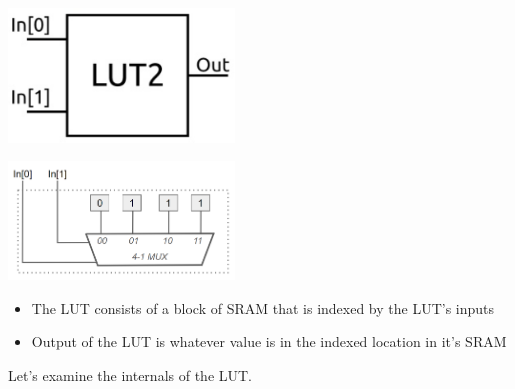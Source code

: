 \documentclass{article}
\begin{document}
\begin{minipage}[t]{0.5\textwidth}
    \centering
    \includegraphics[width=6cm, scale=1]{S2/2LUT.PNG}
\end{minipage}%
\begin{minipage}[t]{0.5\textwidth}
    \centering
    \includegraphics[width=6cm, scale=1]{S2/2LUT_muxView.PNG}
\end{minipage}%


\begin{itemize}
    \item The LUT consists of a block of SRAM that is indexed by the LUT's inputs
    \item Output of the LUT is whatever value is in the indexed location in it's SRAM
\end{itemize}

\vspace{0.25cm}
Let's examine the internals of the LUT.
\end{document}
